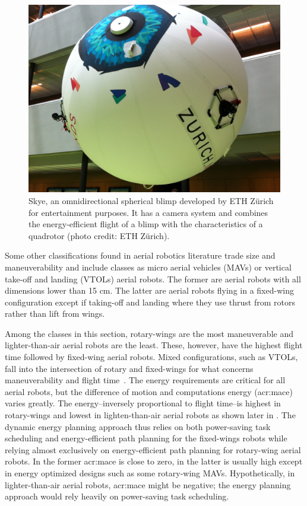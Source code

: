 \begin{figure}[t]
  \sfr
  \centering
  \includegraphics[width=.7\textwidth]{pictures/IMG_2612}
  \caption[Skye, an omnidirectional spherical blimp]{Skye, an omnidirectional spherical blimp developed by ETH Z\"urich for entertainment purposes. It has a camera system and combines the energy-efficient flight of a blimp with the characteristics of a quadrotor {\scriptsize(photo credit: ETH Z\"urich)}.}   
  \label{fig:skye-blimp}
  \efr
\end{figure}

Some other classifications found in aerial robotics literature trade size and maneuverability and include classes as micro aerial vehicles (MAVs) or vertical take-off and landing (VTOLs) aerial robots. The former are aerial robots with all dimensions lower than 15 cm. The latter are aerial robots flying in a fixed-wing configuration except if taking-off and landing where they use thrust from rotors rather than lift from wings. 

Among the classes in this section, rotary-wings are the most maneuverable and lighter-than-air aerial robots are the least. These, however, have the highest flight time followed by fixed-wing aerial robots. Mixed configurations, such as VTOLs, fall into the intersection of rotary and fixed-wings for what concerns maneuverability and flight time~\citep{siciliano2016springer}. The energy requirements are critical for all aerial robots, but the difference of motion and computations energy (\Gls{acr:mace}) varies greatly. The energy--inversely proportional to flight time--is highest in rotary-wings and lowest in lighten-than-air aerial robots as shown later in . The dynamic energy planning approach thus relies on both power-saving task scheduling and energy-efficient path planning for the fixed-wings robots while relying almost exclusively on energy-efficient path planning for rotary-wing aerial robots. In the former \Gls{acr:mace} is close to zero, in the latter is usually high except in energy optimized designs such as some rotary-wing MAVs. Hypothetically, in lighter-than-air aerial robots, \Gls{acr:mace} might be negative; the energy planning approach would rely heavily on power-saving task scheduling.

